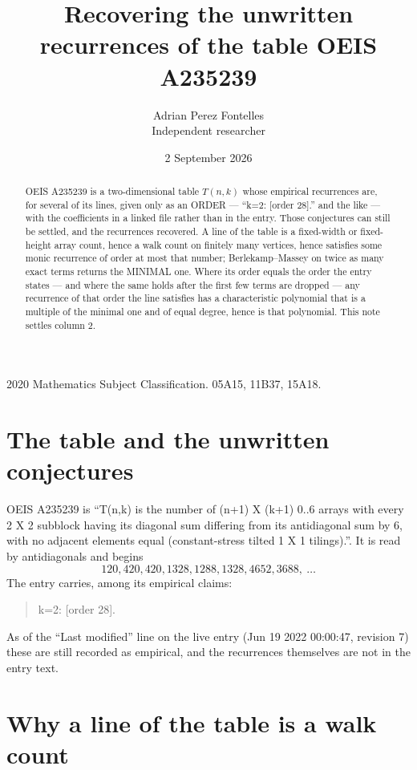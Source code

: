 \documentclass[11pt,a4paper]{article}
\title{Recovering the unwritten recurrences of the table OEIS A235239}
\author{Adrian Perez Fontelles\\ \small Independent researcher}
\date{2 September 2026}
\theoremstyle{plain}
\theoremstyle{definition}
\begin{document}
\maketitle

\begin{abstract}
OEIS A235239 is a two-dimensional table $T(n,k)$ whose empirical recurrences are, for several of
its lines, given only as an ORDER --- ``k=2: [order 28].'' and the like --- with the
coefficients in a linked file rather than in the entry. Those conjectures can still be settled,
and the recurrences recovered. A line of the table is a fixed-width or fixed-height array
count, hence a walk count on finitely many vertices, hence satisfies some monic recurrence of
order at most that number; Berlekamp--Massey on twice as many exact terms returns the MINIMAL
one. Where its order equals the order the entry states --- and where the same holds after the
first few terms are dropped --- any recurrence of that order the line satisfies has a
characteristic polynomial that is a multiple of the minimal one and of equal degree, hence is
that polynomial. This note settles column 2.
\end{abstract}

\noindent\small 2020 Mathematics Subject Classification. 05A15, 11B37, 15A18.\normalsize

\section{The table and the unwritten conjectures}

OEIS A235239 is ``T(n,k) is the number of (n+1) X (k+1) 0..6 arrays with every 2 X 2 subblock having its diagonal sum differing from its antidiagonal sum by 6, with no adjacent elements equal (constant-stress tilted 1 X 1 tilings).''. It is read by antidiagonals and begins
\[
120, 420, 420, 1328, 1288, 1328, 4652, 3688,\ \dots
\]
The entry carries, among its empirical claims:
\begin{quote}\small
k=2: [order 28].
\end{quote}
As of the ``Last modified'' line on the live entry (Jun 19 2022 00:00:47, revision 7) these are still
recorded as empirical, and the recurrences themselves are not in the entry text.

\section{Why a line of the table is a walk count}
\end{document}

